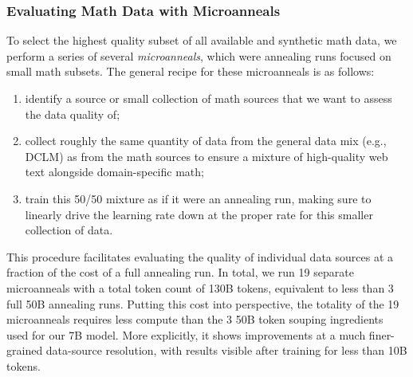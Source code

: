 \documentclass[table]{ai2style/ai2}
\begin{document}
\subsubsection{Evaluating Math Data with Microanneals}
\label{sec:microanneals}

To select the highest quality subset of all available and synthetic math data, we perform a series of several \textit{microanneals}, which were annealing runs focused on small math subsets. 
The general recipe for these microanneals is as follows:
\begin{enumerate}
\item  identify a source or small collection of math sources that we want to assess the data quality of; 
\item collect roughly the same quantity of data from the general data mix (e.g., DCLM) as from the math sources to ensure a mixture of high-quality web text alongside domain-specific math;
\item  train this 50/50 mixture as if it were an annealing run, making sure to linearly drive the learning rate down at the proper rate for this smaller collection of data. 
\end{enumerate}
This procedure facilitates evaluating  the quality of individual data sources at a fraction of the cost of a full annealing run. In total, we run 19 separate microanneals with a total token count of 130B tokens, equivalent to less than 3 full 50B annealing runs. Putting this cost into perspective, the totality of the 19 microanneals requires less compute than the 3 50B token souping ingredients used for our 7B model.
More explicitly, it shows improvements at a much finer-grained data-source resolution, with results visible after training for less than 10B tokens.
\end{document}
